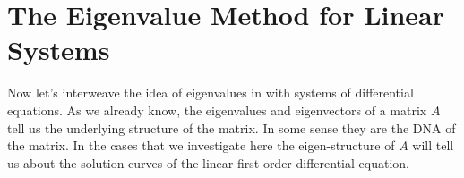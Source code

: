 %             



\newpage\section{The Eigenvalue Method for Linear Systems}
Now let's interweave the idea of eigenvalues in with systems of differential equations. As
we already know, the eigenvalues and eigenvectors of a matrix $A$ tell us the underlying
structure of the matrix.  In some sense they are the DNA of the matrix.  In the cases that
we investigate here the eigen-structure of $A$ will tell us about the solution curves of
the linear first order differential equation.

